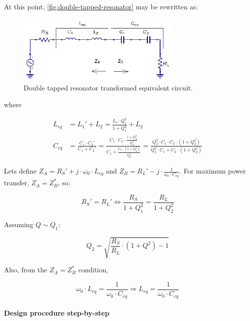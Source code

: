 \noindent At this point, \ref{fig:double-tapped-resonator} may be rewritten as:

\begin{figure}[H]
\centering
\includegraphics[width=80mm]{Double-Tapped-Resonator-Transformed}
\caption{Double tapped resonator transformed equivalent circuit.}
\label{fig:double-tapped-resonator-transformed}
\end{figure}

\noindent where

\begin{align}
  L_{eq} &= L_1' + L_2 = \frac{L_1 \cdot Q_1^2}{1 + Q_1^2} + L_2\\
  C_{eq} &= \frac{C_1 \cdot C_2'}{C_1 + C_2'} = \frac{C_1 \cdot C_2 \cdot \frac{1 + Q_2^2}{Q_2^2}}{C_1 + \frac{C_2 \cdot (1 + Q_2^2)}{Q_2^2}} = \frac{Q_2^2 \cdot C_1 \cdot C_2 \cdot (1 + Q_2^2)}{Q_2^2 \cdot C_1 + C_2 \cdot (1 + Q_2^2)}
\end{align}

\noindent Lets define $Z_A = R_S' + j \cdot \omega_0 \cdot L_{eq}$ and $Z_B = R_L' - j \cdot \frac{1}{\omega_0 \cdot C_{eq}}$. For maximum power transfer, $Z_A = Z_B^*$, so:

\begin{equation}
R_S' = R_L' \Longleftrightarrow   \frac{R_S}{1 + Q_1^2} = \frac{R_L}{1 + Q_2^2}
\end{equation}

\noindent Assuming $Q \sim Q_1$:

\begin{equation}
Q_2 = \sqrt{\frac{R_S}{R_L} \cdot \left(1 + Q^2\right) - 1}
\end{equation}

\noindent Also, from the $Z_A = Z_B^*$ condition,

\begin{equation}
\omega_0 \cdot L_{eq} = \frac{1}{\omega_0 \cdot C_{eq}} \Longrightarrow L_{eq} = \frac{1}{\omega_0 \cdot C_{eq}} 
\end{equation}

\paragraph{Design procedure step-by-step}

